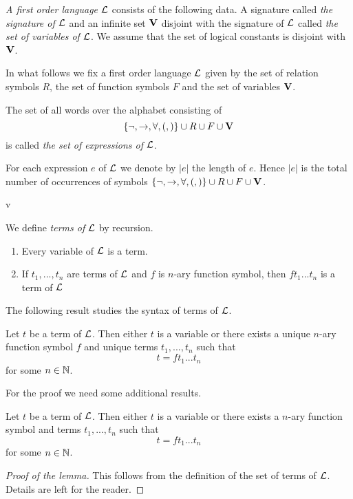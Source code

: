 \begin{definition}
\textit{A first order language ${\mathcal L}$} consists of the following data. A signature called \textit{the signature of ${\mathcal L}$} and an infinite set $\mathbf{V}$ disjoint with the signature of ${\mathcal L}$ called \textit{the set of variables of ${\mathcal L}$}. We assume that the set of logical constants is disjoint with $\mathbf{V}$.
\end{definition}
\noindent
In what follows we fix a first order language ${\mathcal L}$ given by the set of relation symbols $R$, the set of function symbols $F$ and the set of variables $\mathbf{V}$. 

\begin{definition}
The set of all words over the alphabet consisting of
$$\{\neg, \rightarrow, \forall, (, )\} \cup R \cup F \cup \mathbf{V}$$
is called \textit{the set of expressions of ${\mathcal L}$}.
\end{definition}
\noindent
For each expression $e$ of ${\mathcal L}$ we denote by $|e|$ the length of $e$. Hence $|e|$ is the total number of occurrences of symbols $\{\neg, \rightarrow, \forall, (, )\} \cup R \cup F \cup \mathbf{V}$.

v\begin{definition}
We define \textit{terms of ${\mathcal L}$} by recursion.
\begin{enumerate}[label=\textbf{(\arabic*)}, leftmargin=3.0em]
\item Every variable of ${\mathcal L}$ is a term.
\item If $t_1,...,t_n$ are terms of ${\mathcal L}$ and $f$ is $n$-ary function symbol, then $ft_1...t_n$ is a term of ${\mathcal L}$
\end{enumerate}
\end{definition}
\noindent
The following result studies the syntax of terms of ${\mathcal L}$.

\begin{theorem}\label{theorem:unique_readebility_of_terms}
Let $t$ be a term of ${\mathcal L}$. Then either $t$ is a variable or there exists a unique $n$-ary function symbol $f$ and unique terms $t_1,...,t_n$ such that
$$t = ft_1...t_n$$
for some $n \in {\mathbb N}$.
\end{theorem}
\noindent
For the proof we need some additional results.

\begin{lemma}\label{lemma:term_presentation}
Let $t$ be a term of ${\mathcal L}$. Then either $t$ is a variable or there exists a $n$-ary function symbol
and terms $t_1,...,t_n$ such that
$$t = ft_1...t_n$$
for some $n\in{\mathbb N}$.
\end{lemma}
\begin{proof}[Proof of the lemma]
This follows from the definition of the set of terms of ${\mathcal L}$. Details are left for the
reader.
\end{proof}

